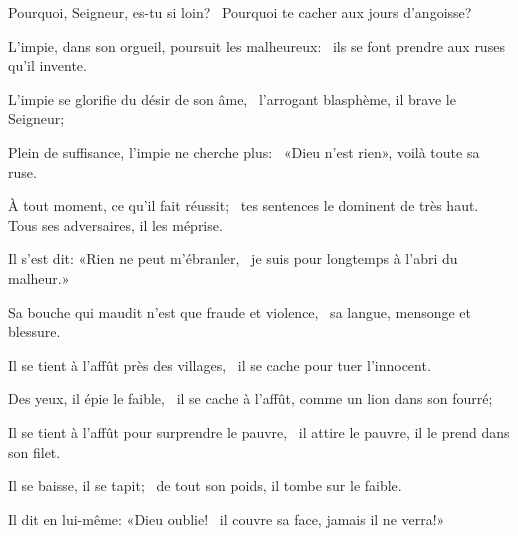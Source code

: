 \item Pourquoi, Seigneur, es-tu si loin?~\psstar{} Pourquoi te cacher aux jours d'angoisse?
\item L'impie, dans son orgueil, poursuit les malheureux:~\psstar{} ils se font prendre aux ruses qu'il invente.
\item L'impie se glorifie du désir de son âme,~\psstar{} l'arrogant blasphème, il brave le Seigneur;
\item Plein de suffisance, l'impie ne cherche plus:~\psstar{} «Dieu n'est rien», voilà toute sa ruse.
\item À tout moment, ce qu'il fait réussit;~\pscross{} tes sentences le dominent de très haut.~\psstar{} Tous ses adversaires, il les méprise.
\item Il s'est dit: «Rien ne peut m'ébranler,~\psstar{} je suis pour longtemps à l'abri du malheur.»
\item Sa bouche qui maudit n'est que fraude et violence,~\psstar{} sa langue, mensonge et blessure.
\item Il se tient à l'affût près des villages,~\psstar{} il se cache pour tuer l'innocent.
\item Des yeux, il épie le faible,~\psstar{} il se cache à l'affût, comme un lion dans son fourré;
\item Il se tient à l'affût pour surprendre le pauvre,~\psstar{} il attire le pauvre, il le prend dans son filet.
\item Il se baisse, il se tapit;~\psstar{} de tout son poids, il tombe sur le faible.
\item Il dit en lui-même: «Dieu oublie!~\psstar{} il couvre sa face, jamais il ne verra!»